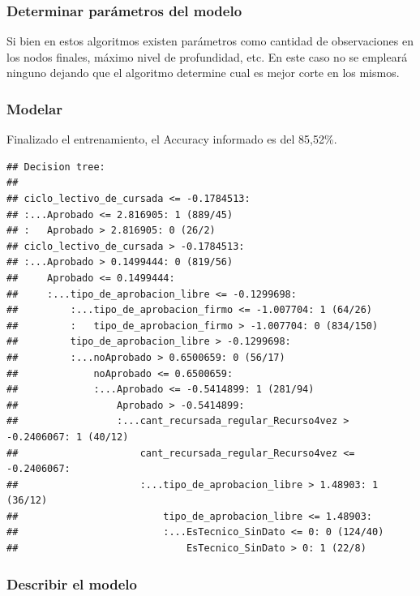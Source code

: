 \subsubsection{Determinar parámetros del modelo}

Si bien en estos algoritmos existen parámetros como cantidad de
observaciones en los nodos finales, máximo nivel de profundidad, etc. En este caso no se empleará ninguno dejando que el algoritmo determine cual es mejor corte en los mismos.

\subsubsection{Modelar}

Finalizado el entrenamiento, el Accuracy informado es del 85,52\%.

\begin{lstlisting}
## Decision tree:
## 
## ciclo_lectivo_de_cursada <= -0.1784513:
## :...Aprobado <= 2.816905: 1 (889/45)
## :   Aprobado > 2.816905: 0 (26/2)
## ciclo_lectivo_de_cursada > -0.1784513:
## :...Aprobado > 0.1499444: 0 (819/56)
##     Aprobado <= 0.1499444:
##     :...tipo_de_aprobacion_libre <= -0.1299698:
##         :...tipo_de_aprobacion_firmo <= -1.007704: 1 (64/26)
##         :   tipo_de_aprobacion_firmo > -1.007704: 0 (834/150)
##         tipo_de_aprobacion_libre > -0.1299698:
##         :...noAprobado > 0.6500659: 0 (56/17)
##             noAprobado <= 0.6500659:
##             :...Aprobado <= -0.5414899: 1 (281/94)
##                 Aprobado > -0.5414899:
##                 :...cant_recursada_regular_Recurso4vez > -0.2406067: 1 (40/12)
##                     cant_recursada_regular_Recurso4vez <= -0.2406067:
##                     :...tipo_de_aprobacion_libre > 1.48903: 1 (36/12)
##                         tipo_de_aprobacion_libre <= 1.48903:
##                         :...EsTecnico_SinDato <= 0: 0 (124/40)
##                             EsTecnico_SinDato > 0: 1 (22/8)
\end{lstlisting}

\subsubsection{Describir el modelo}

